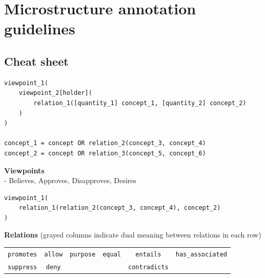 \section{Microstructure annotation guidelines}
\label{sec:microstructure_annotation_appendix}


\subsection*{Cheat sheet}

\begin{verbatim}
viewpoint_1(
	viewpoint_2[holder](
		relation_1([quantity_1] concept_1, [quantity_2] concept_2)
	)
)

concept_1 = concept OR relation_2(concept_3, concept_4)
concept_2 = concept OR relation_3(concept_5, concept_6)

\end{verbatim}

\noindent \textbf{Viewpoints} \\
- Believes, Approves, Disapproves, Desires

\begin{verbatim}
viewpoint_1(
	relation_1(relation_2(concept_3, concept_4), concept_2)
)
\end{verbatim}

\noindent \textbf{Relations} (grayed columns indicate dual meaning between relations in each row)

\begin{table}[!htb]
\begin{tabular}{|c c c c c c|}
\hline
\cellcolor{gray!25} \texttt{promotes} & \cellcolor{gray!25}\texttt{allow} & \texttt{purpose} & \texttt{equal} & \cellcolor{gray!25}\texttt{entails}     & \texttt{has\_associated} \\
\cellcolor{gray!25} \texttt{suppress} & \cellcolor{gray!25}\texttt{deny}  &         &       & \cellcolor{gray!25}\texttt{contradicts} &  \\
\hline
\end{tabular}
\end{table}

